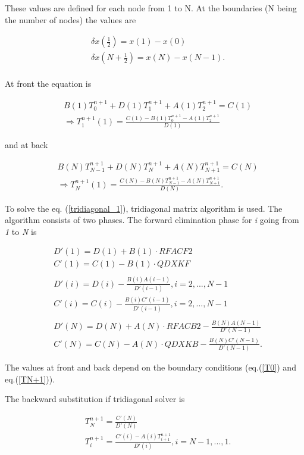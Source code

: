 These values are defined for each node from 1 to N. At the boundaries (N being the number of nodes) the values are

\begin{equation}
\label{x_bc}
\begin{split}
& \delta x(\frac{1}{2}) = x(1)-x(0)\\
& \delta x(N+\frac{1}{2}) = x(N)-x(N-1). \\
\end{split}
\end{equation}

At front the equation is

\begin{equation}
\label{CD_front}
\begin{split}
& B(1)T_0^{n+1}+D(1)T_1^{n+1}+A(1)T_2^{n+1} = C(1) \\
& \Rightarrow T_1^{n+1}(1) = \frac{C(1)-B(1)T^{n+1}_0-A(1)T^{n+1}_2}{D(1)}
\end{split}
\end{equation}

and at back

\begin{equation}
\label{CD_back}
\begin{split}
& B(N)T^{n+1}_{N-1}+D(N)T^{n+1}_N+A(N)T^{n+1}_{N+1} = C(N) \\
& \Rightarrow T^{n+1}_N(1) = \frac{C(N)-B(N)T^{n+1}_{N-1}-A(N)T^{n+1}_{N+1}}{D(N)}.
\end{split}
\end{equation}

To solve the eq. (\ref{tridiagonal_1}), tridiagonal matrix algorithm is used. The algorithm consists of two phases. The forward elimination phase for \textit{i} going from \textit{1} to \textit{N} is

\begin{equation}
\label{forward}
\begin{split}
& D'(1) = D(1)+B(1)\cdot RFACF2 \\
& C'(1) = C(1)-B(1)\cdot QDXKF \\
& \\
& D'(i) = D(i)-\frac{B(i)A(i-1)}{D'(i-1)}, i = 2, ..., N-1 \\
& C'(i) = C(i)-\frac{B(i)C'(i-1)}{D'(i-1)}, i = 2, ..., N-1\\
& \\
& D'(N) = D(N)+A(N)\cdot RFACB2-\frac{B(N)A(N-1)}{D'(N-1)}\\
& C'(N) = C(N)-A(N)\cdot QDXKB-\frac{B(N)C'(N-1)}{D'(N-1)}.
\end{split}
\end{equation}

The values at front and back depend on the boundary conditions (eq.(\ref{T0}) and eq.(\ref{TN+1})).

The backward substitution if tridiagonal solver is

\begin{equation}
\label{backward}
\begin{split}
& T^{n+1}_N = \frac{C'(N)}{D'(N)}\\
& T^{n+1}_i = \frac{C'(i)-A(i)T^{n+1}_{i+1}}{D'(i)}, i = N-1,..., 1. \\
\end{split}
\end{equation}
